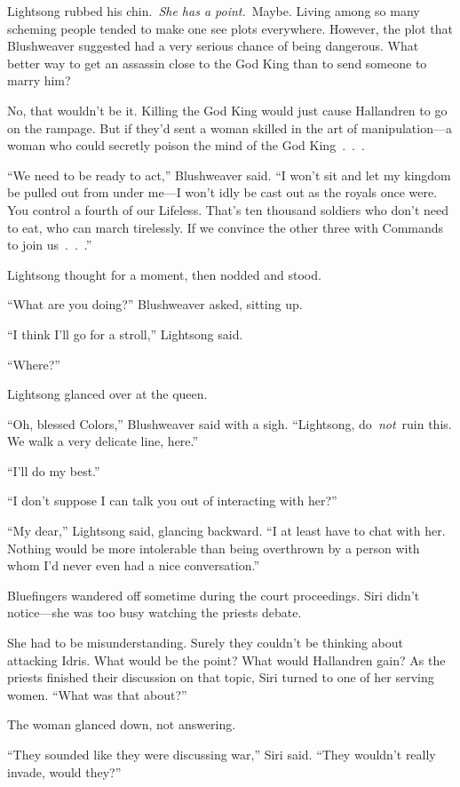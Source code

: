 Lightsong rubbed his chin.~\textit{She has a point.}~Maybe. Living among so many scheming people tended to make one see plots everywhere. However, the plot that Blushweaver suggested had a very serious chance of being dangerous. What better way to get an assassin close to the God King than to send someone to marry him?

No, that wouldn’t be it. Killing the God King would just cause Hallandren to go on the rampage. But if they’d sent a woman skilled in the art of manipulation—a woman who could secretly poison the mind of the God King~.~.~.

“We need to be ready to act,” Blushweaver said. “I won’t sit and let my kingdom be pulled out from under me—I won’t idly be cast out as the royals once were. You control a fourth of our Lifeless. That’s ten thousand soldiers who don’t need to eat, who can march tirelessly. If we convince the other three with Commands to join us~.~.~.”

Lightsong thought for a moment, then nodded and stood.

“What are you doing?” Blushweaver asked, sitting up.

“I think I’ll go for a stroll,” Lightsong said.

“Where?”

Lightsong glanced over at the queen.

“Oh, blessed Colors,” Blushweaver said with a sigh. “Lightsong, do~\textit{not}~ruin this. We walk a very delicate line, here.”

“I’ll do my best.”

“I don’t suppose I can talk you out of interacting with her?”

“My dear,” Lightsong said, glancing backward. “I at least have to chat with her. Nothing would be more intolerable than being overthrown by a person with whom I’d never even had a nice conversation.”

\orn

Bluefingers wandered off sometime during the court proceedings. Siri didn’t notice—she was too busy watching the priests debate.

She had to be misunderstanding. Surely they couldn’t be thinking about attacking Idris. What would be the point? What would Hallandren gain? As the priests finished their discussion on that topic, Siri turned to one of her serving women. “What was that about?”

The woman glanced down, not answering.

“They sounded like they were discussing war,” Siri said. “They wouldn’t really invade, would they?”

